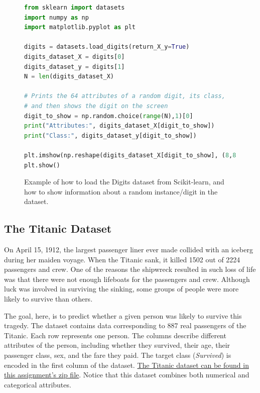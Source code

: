 \documentclass[letterpaper]{article}
\begin{document}
\begin{figure}[h!]
	\centering
	\begin{lstlisting}[language=Python]
from sklearn import datasets
import numpy as np
import matplotlib.pyplot as plt

digits = datasets.load_digits(return_X_y=True)
digits_dataset_X = digits[0]
digits_dataset_y = digits[1]
N = len(digits_dataset_X)

# Prints the 64 attributes of a random digit, its class, 
# and then shows the digit on the screen
digit_to_show = np.random.choice(range(N),1)[0]
print("Attributes:", digits_dataset_X[digit_to_show])
print("Class:", digits_dataset_y[digit_to_show])
	
plt.imshow(np.reshape(digits_dataset_X[digit_to_show], (8,8)))
plt.show()	
\end{lstlisting}
	\caption{Example of how to load the Digits dataset from Scikit-learn, and how to show information about a random instance/digit in the dataset.}
	\label{fig:digits_loading}
\end{figure}

\afterpage{\clearpage}
\FloatBarrier



\newpage
\subsection{The Titanic Dataset}

On April 15, 1912, the largest passenger liner ever made collided with an iceberg during her maiden voyage. When the Titanic sank, it killed 1502 out of 2224 passengers and crew. One of the reasons the shipwreck resulted in such loss of life was that there were not enough lifeboats for the passengers and crew. Although luck was involved in surviving the sinking, some groups of people were more likely to survive than others.

The goal, here, is to predict whether a given person was likely to survive this tragedy. The dataset contains data corresponding to 887 real passengers of the Titanic. Each row represents one person. The columns describe different attributes of the person, including whether they survived, their age, their passenger class, sex, and the fare they paid. The target class (\textit{Survived}) is encoded in the first column of the dataset.  \href{https://people.cs.umass.edu/~bsilva/courses/CMPSCI_589/Spring2024/homeworks/final_project.zip}{The Titanic dataset can be found in this assignment's zip file}. Notice that this dataset combines both numerical and categorical attributes.
\end{document}
